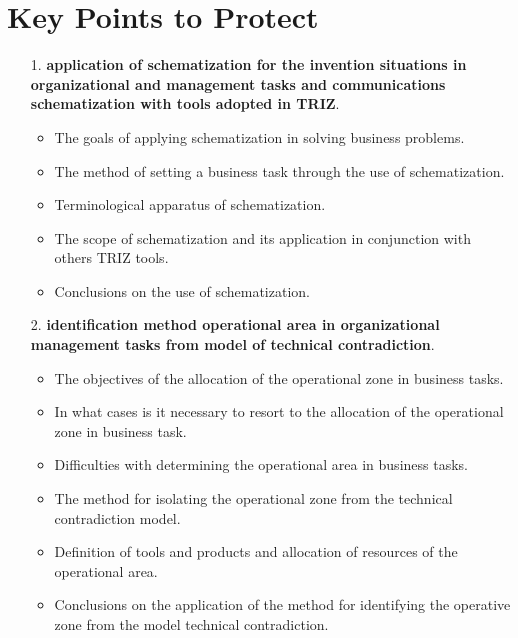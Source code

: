 \documentclass[11pt,a4paper]{book}
\begin{document}
\section{Key Points to Protect}
\begin{itemize}
\item [1.] \textbf{application of schematization for the invention situations
  in organizational and management tasks and communications schematization
  with tools adopted in TRIZ}.
  \begin{itemize}
  \item The goals of applying schematization in solving business problems.
  \item The method of setting a business task through the use of
    schematization.
  \item Terminological apparatus of schematization.
  \item The scope of schematization and its application in conjunction with
    others TRIZ tools.
  \item Conclusions on the use of schematization.
  \end{itemize}
\item [2.] \textbf{identification method operational area in organizational
  management tasks from model of technical contradiction}.
  \begin{itemize}
  \item The objectives of the allocation of the operational zone in business
    tasks.
  \item In what cases is it necessary to resort to the allocation of the
    operational zone in business task.
  \item Difficulties with determining the operational area in business tasks.
  \item The method for isolating the operational zone from the technical
    contradiction model.
  \item Definition of tools and products and allocation of resources of the
    operational area.
  \item Conclusions on the application of the method for identifying the
    operative zone from the model technical contradiction.
  \end{itemize}
\end{itemize}
\end{document}
